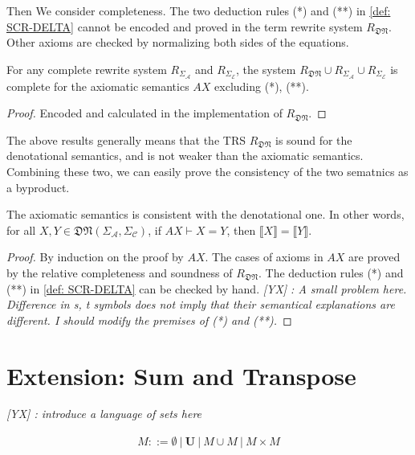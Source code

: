\documentclass[manuscript, review, timestamp]{acmart}
\newcommand{\yx}[1]{\textit{\color{blue}[YX] : #1}}
\newcommand*{\sem}[1]{\llbracket #1 \rrbracket}
\begin{document}
Then We consider completeness. The two deduction rules (*) and (**) in \ref{def: SCR-DELTA} cannot be encoded and proved in the term rewrite system $R_\mathfrak{DN}$. Other axioms are checked by normalizing both sides of the equations.

\begin{lemma}
  For any complete rewrite system $R_{\Sigma_\mathcal{A}}$ and $R_{\Sigma_\mathcal{E}}$, the system $R_\mathfrak{DN}\cup R_{\Sigma_\mathcal{A}} \cup R_{\Sigma_\mathcal{E}}$ is complete for the axiomatic semantics $AX$ excluding (*), (**).
\end{lemma}
\begin{proof}
  Encoded and calculated in the implementation of $R_\mathfrak{DN}$.
\end{proof}

The above results generally means that the TRS $R_\mathfrak{DN}$ is sound for the denotational semantics, and is not weaker than the axiomatic semantics. Combining these two, we can easily prove the consistency of the two sematnics as a byproduct.

\begin{corollary}
  The axiomatic semantics is consistent with the denotational one. In other words, for all $X, Y \in \mathfrak{DN}(\Sigma_\mathcal{A}, \Sigma_\mathcal{C})$, if $AX \vdash X = Y$, then $\sem{X} = \sem{Y}$.
\end{corollary}
\begin{proof}
  By induction on the proof by $AX$. The cases of axioms in $AX$ are proved by the relative completeness and soundness of $R_\mathfrak{DN}$. The deduction rules (*) and (**) in \ref{def: SCR-DELTA} can be checked by hand.
  \yx{A small problem here. Difference in s, t symbols does not imply that their semantical explanations are different. I should modify the premises of (*) and (**).}
\end{proof}



\section{Extension: Sum and Transpose}

\yx{introduce a language of sets here}

\begin{definition}[set]
  \begin{align*}
    M ::= \emptyset\ |\ \mathbf{U}\ |\ M \cup M\ |\ M \times M
  \end{align*}
\end{definition}
\end{document}

